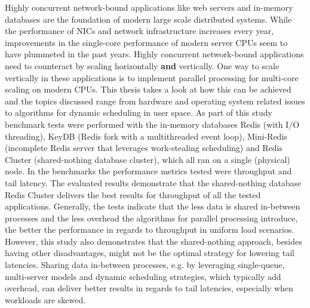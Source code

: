 % 
% 
%
Highly concurrent network-bound applications like web servers and in-memory databases are the foundation of modern large scale distributed systems. While the performance of NICs and network infrastructure increases every year, improvements in the single-core performance of modern server CPUs seem to have plummeted in the past years. 
Highly concurrent network-bound applications need to counteract by scaling horizontally \textbf{and} vertically. One way to scale vertically in these applications is to implement parallel processing for multi-core scaling on modern CPUs. This thesis takes a look at how this can be achieved and the topics discussed range from hardware and operating system related issues to algorithms for dynamic scheduling in user space. \newline
As part of this study benchmark tests were performed with the in-memory databases Redis (with I/O threading), KeyDB (Redis fork with a multithreaded event loop), Mini-Redis (incomplete Redis server that leverages work-stealing scheduling) and Redis Cluster (shared-nothing database cluster), which all ran on a single (physical) node. In the benchmarks the performance metrics tested were throughput and tail latency. The evaluated results demonstrate that the shared-nothing database Redis Cluster delivers the best results for throughput of all the tested applications. Generally, the tests indicate that the less data is shared in-between processes and the less overhead the algorithms for parallel processing introduce, the better the performance in regards to throughput in uniform load scenarios. However, this study also demonstrates that the shared-nothing approach, besides having other disadvantages, might not be the optimal strategy for lowering tail latencies. Sharing data in-between processes, e.g. by leveraging single-queue, multi-server models and dynamic scheduling strategies, which typically add overhead, can deliver better results in regards to tail latencies, especially when workloads are skewed.

